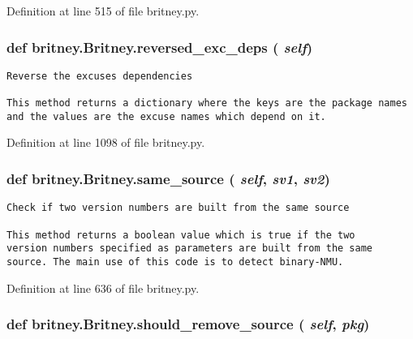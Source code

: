 Definition at line 515 of file britney.py.
\subsubsection{\setlength{\rightskip}{0pt plus 5cm}def britney.Britney.reversed\_\-exc\_\-deps ( {\em self})}\label{classbritney_1_1Britney_be1b4af9d6c6650c70b24267412bc1a8}




\footnotesize\begin{verbatim}Reverse the excuses dependencies

This method returns a dictionary where the keys are the package names
and the values are the excuse names which depend on it.
\end{verbatim}
\normalsize
 

Definition at line 1098 of file britney.py.
\subsubsection{\setlength{\rightskip}{0pt plus 5cm}def britney.Britney.same\_\-source ( {\em self},  {\em sv1},  {\em sv2})}\label{classbritney_1_1Britney_85d2e45e8431779b62f398c34972ddf1}




\footnotesize\begin{verbatim}Check if two version numbers are built from the same source

This method returns a boolean value which is true if the two
version numbers specified as parameters are built from the same
source. The main use of this code is to detect binary-NMU.
\end{verbatim}
\normalsize
 

Definition at line 636 of file britney.py.
\subsubsection{\setlength{\rightskip}{0pt plus 5cm}def britney.Britney.should\_\-remove\_\-source ( {\em self},  {\em pkg})}\label{classbritney_1_1Britney_f8a6c9adbdec7a5a982dd2b74febcc08}





